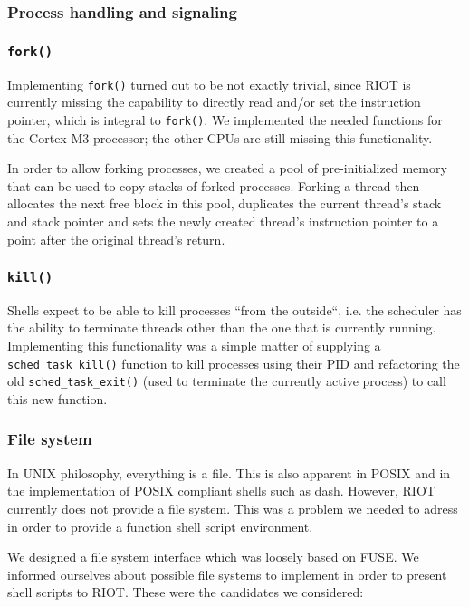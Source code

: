 \documentclass[conference]{IEEEtran}
\begin{document}
\subsubsection{Process handling and signaling}
\label{ssub:Process handling and signaling}

\subsubsection{\texttt{fork()}}
\label{ssub:fork}
Implementing \texttt{fork()} turned out to be not exactly trivial, since
RIOT is currently missing the capability to directly read and/or set the
instruction pointer, which is integral to \texttt{fork()}. We
implemented the needed functions for the Cortex-M3 processor; the other
CPUs are still missing this functionality.

In order to allow forking processes, we created a pool of
pre-initialized memory that can be used to copy stacks of forked
processes. Forking a thread then allocates the next free block in this
pool, duplicates the current thread's stack and stack pointer and sets
the newly created thread's instruction pointer to a point after the
original thread's return.

\subsubsection{\texttt{kill()}}
\label{ssub:kill}
Shells expect to be able to kill processes ``from the outside``, i.e.
the scheduler has the ability to terminate threads other than the one
that is currently running. Implementing this functionality was a simple
matter of supplying a \texttt{sched\_task\_kill()} function to kill
processes using their PID and refactoring the old
\texttt{sched\_task\_exit()} (used to terminate the currently active
process) to call this new function.

\subsubsection{File system}
\label{ssub:File system}
In UNIX philosophy, everything is a file. This is also apparent in POSIX
and in the implementation of POSIX compliant shells such as dash.
However, RIOT currently does not provide a file system. This was
a problem we needed to adress in order to provide a function shell
script environment.

We designed a file system interface which was loosely based on
FUSE\cite{fuse}. We informed ourselves about possible file systems to
implement in order to present shell scripts to RIOT. These were the
candidates we considered:
\end{document}
